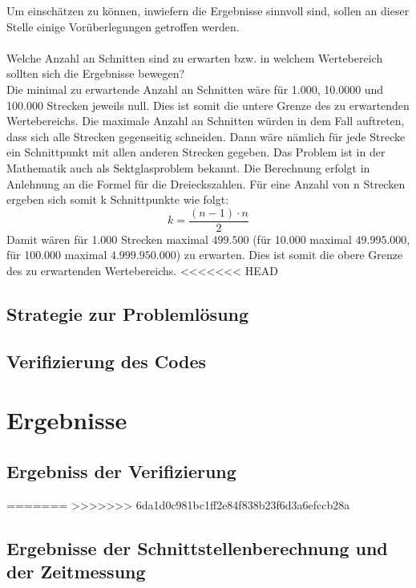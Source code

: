 \documentclass[12pt]{scrartcl}
\begin{document}
Um einschätzen zu können, inwiefern die Ergebnisse sinnvoll sind, sollen an dieser Stelle einige Vorüberlegungen getroffen werden.\\~\\
Welche Anzahl an Schnitten sind zu erwarten bzw. in welchem Wertebereich sollten sich die Ergebnisse bewegen?\\
Die minimal zu erwartende Anzahl an Schnitten wäre für 1.000, 10.0000 und 100.000 Strecken jeweils null.
Dies ist somit die untere Grenze des zu erwartenden Wertebereichs.
Die maximale Anzahl an Schnitten würden in dem Fall auftreten, dass sich alle Strecken gegenseitig schneiden.
Dann wäre nämlich für jede Strecke ein Schnittpunkt mit allen anderen Strecken gegeben.
Das Problem ist in der Mathematik auch als Sektglasproblem bekannt.
Die Berechnung erfolgt in Anlehnung an die Formel für die Dreieckszahlen.
Für eine Anzahl von n Strecken ergeben sich somit k Schnittpunkte wie folgt:
\begin{equation}
k = \frac{(n-1) \cdot n}{2}
\end{equation}
Damit wären für 1.000 Strecken maximal $499.500$ (für 10.000 maximal $49.995.000$,
für 100.000 maximal $4.999.950.000$) zu erwarten.
Dies ist somit die obere Grenze des zu erwartenden Wertebereichs.
<<<<<<< HEAD

\subsection{Strategie zur Problemlösung}

\subsection{Verifizierung des Codes}

\section{Ergebnisse}

\subsection{Ergebniss der Verifizierung}
=======
>>>>>>> 6da1d0c981bc1ff2e84f838b23f6d3a6efccb28a

\subsection{Ergebnisse der Schnittstellenberechnung und der Zeitmessung}
\end{document}
